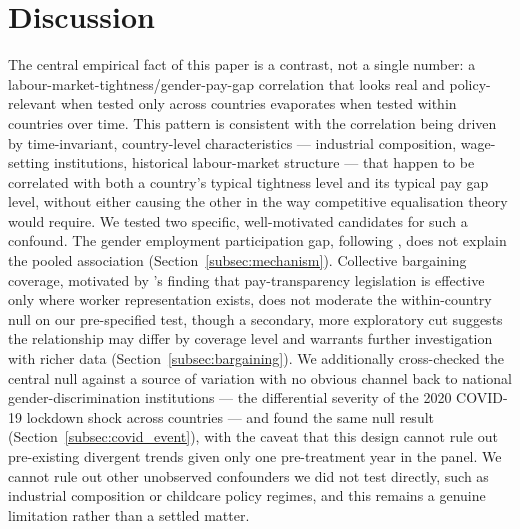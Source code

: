 \documentclass[12pt,a4paper]{article}
\begin{document}
\section{Discussion}
\label{sec:discussion}

The central empirical fact of this paper is a contrast, not a single number: a
labour-market-tightness/gender-pay-gap correlation that looks real and
policy-relevant when tested only across countries evaporates when tested within
countries over time.  This pattern is consistent with the correlation being
driven by time-invariant, country-level characteristics --- industrial
composition, wage-setting institutions, historical labour-market structure ---
that happen to be correlated with both a country's typical tightness level and
its typical pay gap level, without either causing the other in the way
competitive equalisation theory would require.  We tested two specific,
well-motivated candidates for such a confound.  The gender employment
participation gap, following \citet{OlivettiPetrongolo2008}, does not explain
the pooled association (Section~\ref{subsec:mechanism}).  Collective bargaining
coverage, motivated by \citet{VaccaroEtAl2024}'s finding that pay-transparency
legislation is effective only where worker representation exists, does not
moderate the within-country null on our pre-specified test, though a secondary,
more exploratory cut suggests the relationship may differ by coverage level and
warrants further investigation with richer data (Section~\ref{subsec:bargaining}).
We additionally cross-checked the central null against a source of variation
with no obvious channel back to national gender-discrimination institutions ---
the differential severity of the 2020 COVID-19 lockdown shock across countries
--- and found the same null result (Section~\ref{subsec:covid_event}), with the
caveat that this design cannot rule out pre-existing divergent trends given only
one pre-treatment year in the panel.  We cannot rule out other unobserved
confounders we did not test directly, such as industrial composition or
childcare policy regimes, and this remains a genuine limitation rather than a
settled matter.
\end{document}

